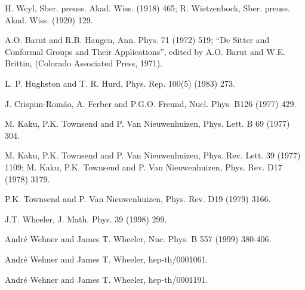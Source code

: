 \documentclass[a4paper,12pt]{article}
\begin{document}
\begin{thebibliography}{99}
  H. Weyl, Sber. preuss. Akad. Wiss. (1918) 465; R.
Wietzenbock, Sber. preuss. Akad. Wiss. (1920) 129.

  A.O. Barut and R.B. Haugen, Ann. Phys. 71 (1972) 519; ``De
Sitter and Conformal Groups and Their Applications'', edited by A.O. Barut
and W.E. Brittin, (Colorado Associated Press, 1971).

  L. P. Hughston and T. R. Hurd, Phys. Rep.
100(5) (1983) 273.

  J. Crispim-Rom\~{a}o, A. Ferber and P.G.O.
Freund, Nucl. Phys. B126 (1977) 429.

  M. Kaku, P.K. Townsend and P. Van Nieuwenhuizen,
Phys. Lett. B 69 (1977) 304.

  M. Kaku, P.K. Townsend and P. Van Nieuwenhuizen,
Phys. Rev. Lett. 39 (1977) 1109; M. Kaku, P.K. Townsend and P. Van
Nieuwenhuizen, Phys. Rev. D17 (1978) 3179.

  P.K. Townsend and P. Van
Nieuwenhuizen, Phys. Rev. D19 (1979) 3166.

  J.T. Wheeler, J. Math. Phys. 39
(1998) 299.

  Andr\'{e} Wehner and James T. Wheeler, Nuc. Phys. B 557
(1999) 380-406.

  Andr\'{e} Wehner and James T. Wheeler, hep-th/0001061.

  Andr\'{e} Wehner and James T. Wheeler, hep-th/0001191.
\end{thebibliography}
\end{document}
